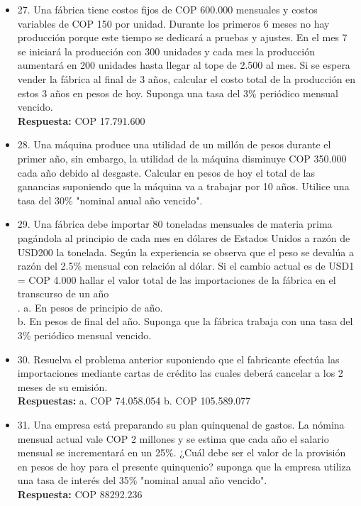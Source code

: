 \begin{itemize}
 \item 27. Una fábrica tiene costos fijos de COP 600.000 mensuales y costos variables de COP 150 por unidad. Durante los primeros 6 meses no hay producción porque este tiempo se dedicará a pruebas y ajustes. En el mes 7 se iniciará la producción con 300 unidades y cada mes la producción aumentará en 200 unidades hasta llegar al tope de 2.500 al mes. Si se espera vender la fábrica al final de 3 años, calcular el costo total de la producción en estos 3 años en pesos de hoy. Suponga una tasa del 3\% periódico  mensual vencido.\\
       \textbf{Respuesta:}  COP 17.791.600\\
       \medskip

 \item 28. Una máquina produce una utilidad de un millón de pesos durante el primer año, sin embargo, la utilidad de la máquina disminuye COP 350.000 cada año debido al desgaste. Calcular en pesos de hoy el total de las ganancias suponiendo que la máquina va a trabajar por 10 años. Utilice una tasa del 30\% "nominal anual año vencido".\\
       \medskip

 \item 29. Una fábrica debe importar 80 toneladas mensuales de materia prima pagándola al principio de cada mes en dólares de Estados Unidos a razón de USD200 la tonelada. Según la experiencia se observa que el peso se devalúa a razón del 2.5\% mensual con relación al dólar. Si el cambio actual es de USD1 = COP 4.000 hallar el valor total de las importaciones de la fábrica en el transcurso de un año\\.
       a. En pesos de principio de año.\\
       b. En pesos de final del año. Suponga que la fábrica trabaja con una tasa del 3\% periódico  mensual vencido.\\
       \medskip

 \item 30. Resuelva el problema anterior suponiendo que el fabricante efectúa las importaciones mediante cartas de crédito las cuales deberá cancelar a los 2 meses de su emisión.\\
       \textbf{Respuestas:} a. COP 74.058.054 \hspace{1,0cm}  b. COP 105.589.077\\
       \medskip

 \item 31. Una empresa está preparando su plan quinquenal de gastos. La nómina mensual actual vale COP 2 millones y se estima que cada año el salario mensual se incrementará en un 25\%. ¿Cuál debe ser el valor de la provisión en pesos de hoy para el presente quinquenio? suponga que la empresa utiliza una tasa de interés del 35\% "nominal anual año vencido".\\
       \textbf{Respuesta:} COP 88292.236\\
       \medskip


\end{itemize}
